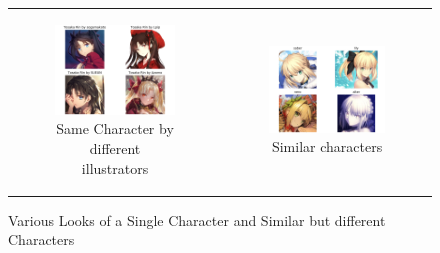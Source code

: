 \documentclass[11.5pt]{article}
\begin{document}
    \begin{figure}[!ht]
        \begin{center}
            \begin{tabular}[c]{cc}
                \begin{subfigure}[h]{0.4\linewidth}
                    \centering
                    \includegraphics[width=0.8\linewidth, scale=1]{./images/tosaka_grid.png}
                    \caption{Same Character by different illustrators}
                \end{subfigure} &
                \begin{subfigure}[h]{0.4\linewidth}
                    \centering
                    \includegraphics[width=0.8\linewidth, scale=1]{./images/saber_grid.png}
                    \caption{Similar characters}
                \end{subfigure}
            \end{tabular}
        \end{center}
        \caption{Various Looks of a Single Character and Similar but different Characters}
    \end{figure}
\end{document}
